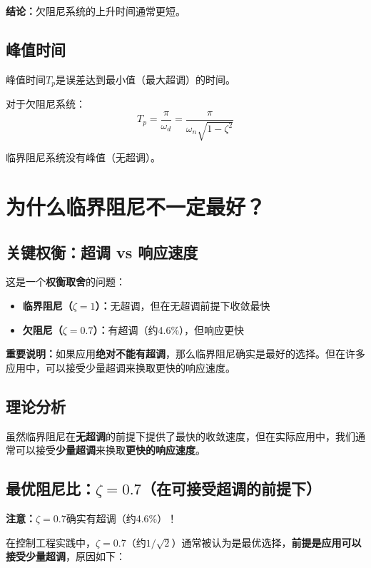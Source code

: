 \documentclass[12pt,a4paper]{article}
\begin{document}
\textbf{结论：}欠阻尼系统的上升时间通常更短。

\subsection{峰值时间}

峰值时间$T_p$是误差达到最小值（最大超调）的时间。

对于欠阻尼系统：
\begin{equation}
T_p = \frac{\pi}{\omega_d} = \frac{\pi}{\omega_n\sqrt{1-\zeta^2}}
\end{equation}

临界阻尼系统没有峰值（无超调）。

\section{为什么临界阻尼不一定最好？}

\subsection{关键权衡：超调 vs 响应速度}

这是一个\textbf{权衡取舍}的问题：

\begin{itemize}
\item \textbf{临界阻尼（$\zeta = 1$）：}无超调，但在无超调前提下收敛最快
\item \textbf{欠阻尼（$\zeta = 0.7$）：}有超调（约4.6\%），但响应更快
\end{itemize}

\textbf{重要说明：}如果应用\textbf{绝对不能有超调}，那么临界阻尼确实是最好的选择。但在许多应用中，可以接受少量超调来换取更快的响应速度。

\subsection{理论分析}

虽然临界阻尼在\textbf{无超调}的前提下提供了最快的收敛速度，但在实际应用中，我们通常可以接受\textbf{少量超调}来换取\textbf{更快的响应速度}。

\subsection{最优阻尼比：$\zeta = 0.7$（在可接受超调的前提下）}

\textbf{注意：}$\zeta = 0.7$确实有超调（约4.6\%）！

在控制工程实践中，$\zeta = 0.7$（约$1/\sqrt{2}$）通常被认为是最优选择，\textbf{前提是应用可以接受少量超调}，原因如下：
\end{document}
